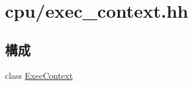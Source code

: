 \hypertarget{exec__context_8hh}{
\section{cpu/exec\_\-context.hh}
\label{exec__context_8hh}
}
\subsection*{構成}
\begin{DoxyCompactItemize}
\item 
class \hyperlink{classExecContext}{ExecContext}
\end{DoxyCompactItemize}
